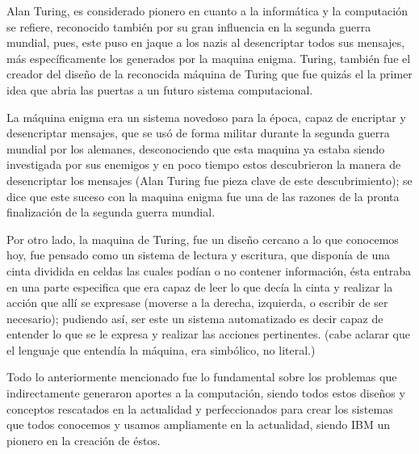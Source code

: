 \documentclass[15pt]{article}
\begin{document}
\vspace{15PT}
Alan Turing, es considerado pionero en cuanto a la informática y la computación se refiere, reconocido también por su gran influencia en la segunda guerra mundial, pues, este puso en jaque a los nazis al desencriptar todos sus mensajes, más específicamente los generados por la maquina enigma. Turing, también fue el creador del diseño de la reconocida máquina de Turing que fue quizás el la primer idea que abria las puertas a un futuro sistema computacional.
 
\vspace{15PT}
La máquina enigma era un sistema novedoso para la época, capaz de encriptar y desencriptar mensajes, que se usó de forma militar durante la segunda guerra mundial por los alemanes, desconociendo que esta maquina ya estaba siendo investigada por sus enemigos y en poco tiempo estos descubrieron la manera de desencriptar los mensajes (Alan Turing fue pieza clave de este descubrimiento); se dice que este suceso con la maquina enigma fue una de las razones de la pronta finalización de la segunda guerra mundial. 

\vspace{15PT}
Por otro lado, la maquina de Turing, fue un diseño cercano a lo que conocemos hoy, fue pensado como un sistema de lectura y escritura, que disponía de una cinta dividida en celdas las cuales podían o no contener información, ésta entraba en una parte especifica que era capaz de leer lo que decía la cinta y realizar la acción que allí se expresase (moverse a la derecha, izquierda, o escribir de ser necesario); pudiendo así, ser este un sistema automatizado es decir capaz de entender lo que se le expresa y realizar las acciones pertinentes. (cabe aclarar que el lenguaje que entendía la máquina, era simbólico, no literal.)

\vspace{15PT}
Todo lo anteriormente mencionado fue lo fundamental sobre los problemas que indirectamente generaron aportes a la computación, siendo todos estos diseños y conceptos rescatados en la actualidad y perfeccionados para crear los sistemas que todos conocemos y usamos ampliamente en la actualidad, siendo IBM un pionero en la creación de éstos.




\end{document}
